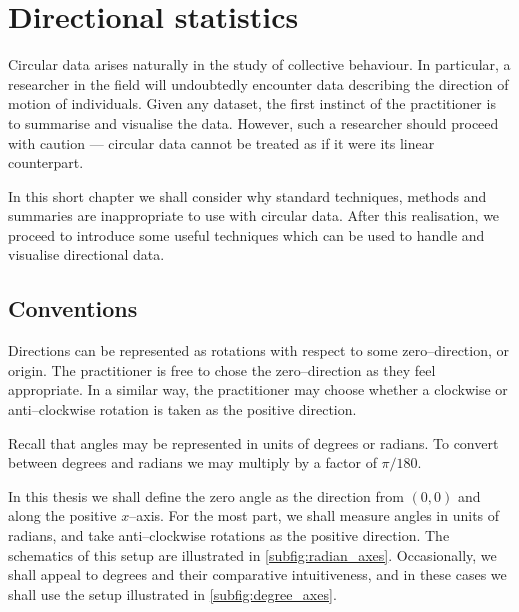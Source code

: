 \graphicspath{{fig/circ_stats_intro/}}

\chapter{Directional statistics}	
\label{cha:direct_stats}


Circular data arises naturally in the study of collective behaviour. In particular, a researcher in 
the field will undoubtedly encounter data describing the direction of motion of individuals. Given 
any dataset, the first instinct of the practitioner is to summarise and visualise the data. However, 
such a researcher should proceed with caution --- circular data cannot be treated as if it were its 
linear counterpart.

In this short chapter we shall consider why standard techniques, methods and summaries are 
inappropriate to use with circular data. After this realisation, we proceed to introduce some useful 
techniques which can be used to handle and visualise directional data.

\section{Conventions}
\label{sec:conventions}

Directions can be represented as rotations with respect to some zero--direction, or origin. The 
practitioner is free to chose the zero--direction as they feel appropriate. In a similar way, the 
practitioner may choose whether a clockwise or anti--clockwise rotation is taken as the positive 
direction.

Recall that angles may be represented in units of degrees or radians. To convert between degrees and 
radians we may multiply by a factor of $\pi/180$\textdegree.

In this thesis we shall define the zero angle as the direction from $(0, 0)$ and along the positive 
$x$--axis. For the most part, we shall measure angles in units of radians, and take anti--clockwise 
rotations as the positive direction. The schematics of this setup are illustrated in 
\cref{subfig:radian_axes}. Occasionally, we shall appeal to degrees and their comparative 
intuitiveness, and in these cases we shall use the setup illustrated in  \cref{subfig:degree_axes}.

